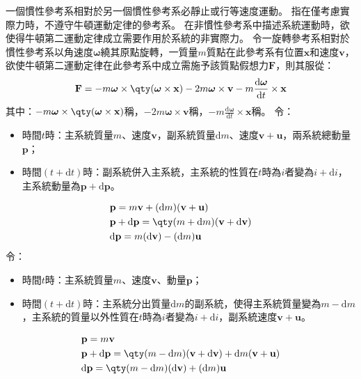 \documentclass[a4paper,12pt]{article}
\begin{document}
一個慣性參考系相對於另一個慣性參考系必靜止或行等速度運動。
指在僅考慮實際力時，不遵守牛頓運動定律的參考系。
在非慣性參考系中描述系統運動時，欲使得牛頓第二運動定律成立需要作用於系統的非實際力。
令一旋轉參考系相對於慣性參考系以角速度$\boldsymbol{\omega}$繞其原點旋轉，一質量$m$質點在此參考系有位置$\mathbf{x}$和速度$\mathbf{v}$，欲使牛頓第二運動定律在此參考系中成立需施予該質點假想力$\mathbf{F}$，則其服從：
\[\mathbf{F}=-m\boldsymbol{\omega}\times\qty(\boldsymbol{\omega}\times\mathbf{x})-2m\boldsymbol{\omega}\times\mathbf{v}-m\frac{\mathrm{d}\boldsymbol{\omega}}{\mathrm{d}t}\times\mathbf{x}\]
其中：$-m\boldsymbol{\omega}\times\qty(\boldsymbol{\omega}\times\mathbf{x})$稱，$-2m\boldsymbol{\omega}\times\mathbf{v}$稱，$-m\frac{\mathrm{d}\boldsymbol{\omega}}{\mathrm{d}t}\times\mathbf{x}$稱。
令：
\begin{itemize}
\item 時間$t$時：主系統質量$m$、速度$\mathbf{v}$，副系統質量$\mathrm{d}m$、速度$\mathbf{v}+\mathbf{u}$，兩系統總動量$\mathbf{p}$；
\item 時間$(t+\mathrm{d}t)$時：副系統併入主系統，主系統的性質在$t$時為$i$者變為$i+\mathrm{d}i$，主系統動量為$\mathbf{p}+\mathrm{d}\mathbf{p}$。
\end{itemize}
\[\begin{aligned}
& \mathbf{p}=m\mathbf{v}+(\mathrm{d}m)(\mathbf{v}+\mathbf{u})\\
& \mathbf{p}+\mathrm{d}\mathbf{p}=\qty(m+\mathrm{d}m)(\mathbf{v}+\mathrm{d}\mathbf{v})\\
& \mathrm{d}\mathbf{p}=m(\mathrm{d}\mathbf{v})-(\mathrm{d}m)\mathbf{u}
\end{aligned}\]
令：
\begin{itemize}
\item 時間$t$時：主系統質量$m$、速度$\mathbf{v}$、動量$\mathbf{p}$；
\item 時間$(t+\mathrm{d}t)$時：主系統分出質量$\mathrm{d}m$的副系統，使得主系統質量變為$m-\mathrm{d}m$，主系統的質量以外性質在$t$時為$i$者變為$i+\mathrm{d}i$，副系統速度$\mathbf{v}+\mathbf{u}$。
\end{itemize}
\[\begin{aligned}
& \mathbf{p}=m\mathbf{v} \\
& \mathbf{p}+\mathrm{d}\mathbf{p}=\qty(m-\mathrm{d}m)(\mathbf{v}+\mathrm{d}\mathbf{v})+\mathrm{d}m(\mathbf{v}+\mathbf{u})\\
& \mathrm{d}\mathbf{p}=\qty(m-\mathrm{d}m)(\mathrm{d}\mathbf{v})+(\mathrm{d}m)\mathbf{u}
\end{aligned}\]
\end{document}
